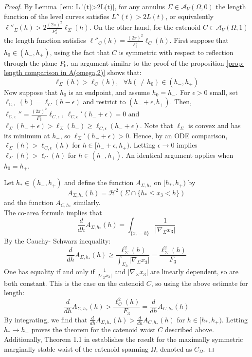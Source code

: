 \documentclass[11pt]{amsart}
\numberwithin{equation}{section}
\theoremstyle{theorem}
\theoremstyle{definition}
\numberwithin{equation}{section}
\begin{document}
\begin{proof}
    By Lemma \ref{lem: L''(t)>2L(t)}, for any annulus $\Sigma \in \mathcal{A}_V(\Omega ,0)$ the length function of the level curves satisfies $L''(t)> 2L(t)$, or equivalently $\ell''_{\Sigma}(h)>2 \frac{(2\pi)^2}{F_3^2}\ell_{\Sigma}(h)$. On the other hand, for the catenoid $C\in \mathcal{A}_V(\Omega ,1)$ the length function satisfies $\ell''_{C}(h)=\frac{(2\pi)^2}{F_3^2}\ell_{C}(h)$.  First suppose that $h_0\in (h_-,h_+)$, using the fact that $C$ is symmetric with respect to reflection through the plane $P_0$, an argument similar to the proof of the proposition \ref{prop: length comparison in A(omega,2)} shows that: 
   $$
   \ell_{\Sigma}(h) > \ell_C(h),\ \ \ \forall h(\neq h_0) \in (h_-,h_+)
   $$
   Now suppose that $h_0$ is an endpoint, and assume $h_0=h_-$. For $\epsilon >0$ small, set $\ell_{C,\epsilon}(h)=\ell_{C}(h-\epsilon)$ and restrict to $(h_-+\epsilon ,h_+)$. Then, $\ell_{C,\epsilon}''=\frac{(2\pi)^2}{F_3^2}\ell_{C,\epsilon}$, $\ell_{C,\epsilon}'(h_-+\epsilon)=0$ and $\ell_{\Sigma}(h_-+\epsilon)>\ell_{\Sigma}(h_-)\geq \ell_{C,\epsilon}(h_-+\epsilon)$. Note that $\ell_{\Sigma}$ is convex and has its minimum at $h_-$, so $\ell_{\Sigma}'(h_-+\epsilon)>0$. Hence, by an ODE comparison, $\ell_{\Sigma}(h)>\ell_{C,\epsilon}(h)$ for $h\in [h_-+\epsilon ,h_+)$. Letting $\epsilon \rightarrow 0$ implies $\ell_{\Sigma}(h)> \ell_{C}(h)$ for $h\in (h_-,h_+)$.  An identical argument applies when $h_0=h_+$.
    \medskip
   
   Let $h_*\in (h_-,h_+)$ and define the function $A_{\Sigma ,h_*}$ on $[h_*,h_+)$ by
   $$
   A_{\Sigma ,h_*}(h)=\mathcal{H}^2(\Sigma \cap \{ h_* \leq x_3 <h\})
   $$
   and the function $A_{C,h_*}$ similarly.\\
   The co-area formula implies that 
   $$
   \frac{d}{dh}A_{\Sigma ,h_*}(h)= \int_{\{ x_3=h\}} \frac{1}{\vert \nabla_{\Sigma}x_3\vert}
   $$
By the Cauchy- Schwarz inequality:
$$
\frac{d}{dh}A_{\Sigma ,h_*}(h) \geq \frac{\ell_{\Sigma}^2(h)}{\int_{\Sigma_h}\vert \nabla_{\Sigma}x_3\vert}= \frac{\ell_{\Sigma}^2(h)}{F_3}
$$
One has equality if and only if $\frac{1}{\vert \nabla_{\Sigma}x_3\vert}$ and $\vert \nabla_{\Sigma}x_3\vert$ are linearly dependent, so are both constant. This is the case on the catenoid $C$, so using the above estimate for length:
$$
\frac{d}{dh}A_{\Sigma ,h_*}(h) >  \frac{\ell_{C}^2(h)}{F_3} = \frac{d}{dh}A_{C ,h_*}(h)
$$
By integrating, we find that $\frac{d}{dh}A_{\Sigma ,h_*}(h) > \frac{d}{dh}A_{C ,h_*}(h)$ for $h\in [h_*,h_+)$. Letting $h_* \rightarrow h_-$  proves the theorem for the catenoid waist $C$ described above. Additionally, Theorem 1.1 in \cite{bernstein2014variational} establishes the result for the maximally symmetric marginally stable waist of the catenoid spanning $\Omega$, denoted as $C_{\Omega}$.
\end{proof}
\end{document}
